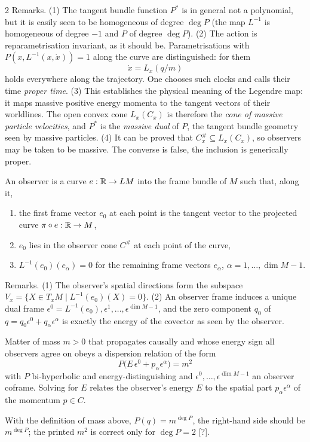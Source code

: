\begin{paracol}{2}
Remarks. (1) The tangent bundle function $P^*$ is in general not a polynomial, but it is easily seen to be homogeneous of degree $\deg P$ (the map $L^{-1}$ is homogeneous of degree $-1$ and $P$ of degree $\deg P$). (2) The action is reparametrisation invariant, as it should be. Parametrisations with $P(x,L^{-1}(x,\dot x))=1$ along the curve are distinguished: for them
\[
  \dot x=L_x(q/m)
\]
holds everywhere along the trajectory. One chooses such clocks and calls their time \emph{proper time}. (3) This establishes the physical meaning of the Legendre map: it maps massive positive energy momenta to the tangent vectors of their worldlines. The open convex cone $L_x(C_x)$ is therefore the \emph{cone of massive particle velocities}, and $P^*$ is the \emph{massive dual} of $P$, the tangent bundle geometry seen by massive particles. (4) It can be proved that $C^\#_x\subseteq L_x(C_x)$, so observers may be taken to be massive. The converse is false, the inclusion is generically proper.

\begin{definition}\label{def:c29-observer}
An observer is a curve $e:\mathbb{R}\to LM$ into the frame bundle of $M$ such that, along it,
\begin{enumerate}
  \item the first frame vector $e_0$ at each point is the tangent vector to the projected curve $\pi\circ e:\mathbb{R}\to M$,
  \item $e_0$ lies in the observer cone $C^\#$ at each point of the curve,
  \item $L^{-1}(e_0)(e_\alpha)=0$ for the remaining frame vectors $e_\alpha$, $\alpha=1,\dots,\dim M-1$.
\end{enumerate}
\end{definition}

Remarks. (1) The observer's spatial directions form the subspace $V_x=\{X\in T_xM\mid L^{-1}(e_0)(X)=0\}$. (2) An observer frame induces a unique dual frame $\epsilon^0=L^{-1}(e_0),\epsilon^1,\dots,\epsilon^{\dim M-1}$, and the zero component $q_0$ of $q=q_0\epsilon^0+q_\alpha\epsilon^\alpha$ is exactly the energy of the covector as seen by the observer.

\begin{theorem}\label{thm:c29-dispersion}
Matter of mass $m>0$ that propagates causally and whose energy sign all observers agree on obeys a dispersion relation of the form
\[
  P\bigl(E\,\epsilon^0+p_\alpha\epsilon^\alpha\bigr)=m^2
\]
with $P$ bi-hyperbolic and energy-distinguishing and $\epsilon^0,\dots,\epsilon^{\dim M-1}$ an observer coframe. Solving for $E$ relates the observer's energy $E$ to the spatial part $p_\alpha\epsilon^\alpha$ of the momentum $p\in C$.
\end{theorem}
\begin{coursenote}
With the definition of mass above, $P(q)=m^{\deg P}$, the right-hand side should be $m^{\deg P}$; the printed $m^2$ is correct only for $\deg P=2$ [?].
\end{coursenote}


\end{paracol}
